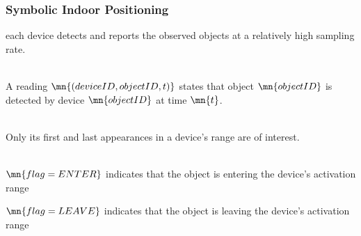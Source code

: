 
\begin{frame}
\frametitle{Symbolic Indoor Positioning}

  each device detects and reports the observed objects at a relatively high sampling rate.\\~

  A reading $\mn{(deviceID, objectID, t)}$ states that object $\mn{objectID}$ is detected by device $\mn{objectID}$ at time $\mn{t}$.\\~

  Only its first and last appearances in a device's range are of interest.\\~

  \begin{fitemize}
    \item $\mn{flag = ENTER}$ indicates that the object is entering the device's activation range
    \item $\mn{flag = LEAVE}$ indicates that the object is leaving the device's activation range
  \end{fitemize}

\end{frame}


